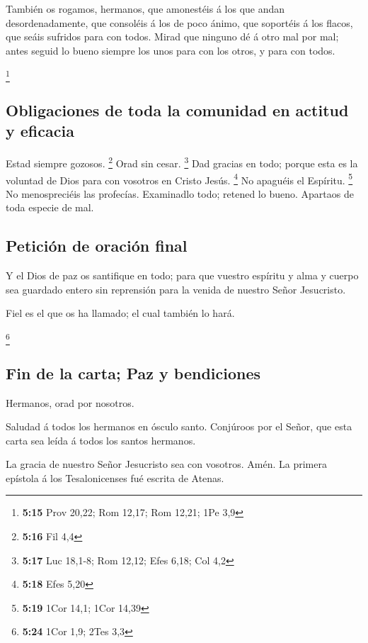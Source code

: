  También os rogamos, hermanos, que amonestéis á los que
andan desordenadamente, que consoléis á los de poco ánimo, que soportéis
á los flacos, que seáis sufridos para con todos.  Mirad
que ninguno dé á otro mal por mal; antes seguid lo bueno siempre los
unos para con los otros, y para con todos.

\footnote{\textbf{5:15} Prov 20,22; Rom 12,17; Rom 12,21; 1Pe 3,9}

\hypertarget{obligaciones-de-toda-la-comunidad-en-actitud-y-eficacia}{%
\subsection{Obligaciones de toda la comunidad en actitud y
eficacia}\label{obligaciones-de-toda-la-comunidad-en-actitud-y-eficacia}}

 Estad siempre gozosos. \footnote{\textbf{5:16} Fil 4,4}
 Orad sin cesar. \footnote{\textbf{5:17} Luc 18,1-8; Rom
  12,12; Efes 6,18; Col 4,2}  Dad gracias en todo; porque
esta es la voluntad de Dios para con vosotros en Cristo Jesús.
\footnote{\textbf{5:18} Efes 5,20}  No apaguéis el
Espíritu. \footnote{\textbf{5:19} 1Cor 14,1; 1Cor 14,39} 
No menospreciéis las profecías.  Examinadlo todo; retened
lo bueno.  Apartaos de toda especie de mal.

\hypertarget{peticiuxf3n-de-oraciuxf3n-final}{%
\subsection{Petición de oración
final}\label{peticiuxf3n-de-oraciuxf3n-final}}

 Y el Dios de paz os santifique en todo; para que vuestro
espíritu y alma y cuerpo sea guardado entero sin reprensión para la
venida de nuestro Señor Jesucristo.

 Fiel es el que os ha llamado; el cual también lo hará.

\footnote{\textbf{5:24} 1Cor 1,9; 2Tes 3,3}

\hypertarget{fin-de-la-carta-paz-y-bendiciones}{%
\subsection{Fin de la carta; Paz y
bendiciones}\label{fin-de-la-carta-paz-y-bendiciones}}

 Hermanos, orad por nosotros.

 Saludad á todos los hermanos en ósculo santo.
 Conjúroos por el Señor, que esta carta sea leída á todos
los santos hermanos.

 La gracia de nuestro Señor Jesucristo sea con vosotros.
Amén. La primera epístola á los Tesalonicenses fué escrita de Atenas.
